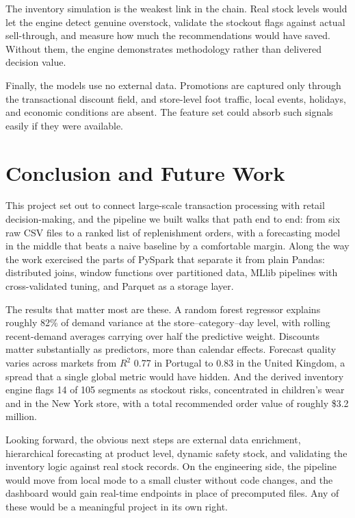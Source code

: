 \documentclass[11pt,a4paper]{article}
\begin{document}
The inventory simulation is the weakest link in the chain. Real stock levels would let the engine detect genuine overstock, validate the stockout flags against actual sell-through, and measure how much the recommendations would have saved. Without them, the engine demonstrates methodology rather than delivered decision value.

Finally, the models use no external data. Promotions are captured only through the transactional discount field, and store-level foot traffic, local events, holidays, and economic conditions are absent. The feature set could absorb such signals easily if they were available.

\section{Conclusion and Future Work}\label{sec:conclusion}

This project set out to connect large-scale transaction processing with retail decision-making, and the pipeline we built walks that path end to end: from six raw CSV files to a ranked list of replenishment orders, with a forecasting model in the middle that beats a naive baseline by a comfortable margin. Along the way the work exercised the parts of PySpark that separate it from plain Pandas: distributed joins, window functions over partitioned data, MLlib pipelines with cross-validated tuning, and Parquet as a storage layer.

The results that matter most are these. A random forest regressor explains roughly 82\% of demand variance at the store--category--day level, with rolling recent-demand averages carrying over half the predictive weight. Discounts matter substantially as predictors, more than calendar effects. Forecast quality varies across markets from $R^2$ 0.77 in Portugal to 0.83 in the United Kingdom, a spread that a single global metric would have hidden. And the derived inventory engine flags 14 of 105 segments as stockout risks, concentrated in children's wear and in the New York store, with a total recommended order value of roughly \$3.2 million.

Looking forward, the obvious next steps are external data enrichment, hierarchical forecasting at product level, dynamic safety stock, and validating the inventory logic against real stock records. On the engineering side, the pipeline would move from local mode to a small cluster without code changes, and the dashboard would gain real-time endpoints in place of precomputed files. Any of these would be a meaningful project in its own right.
\end{document}
